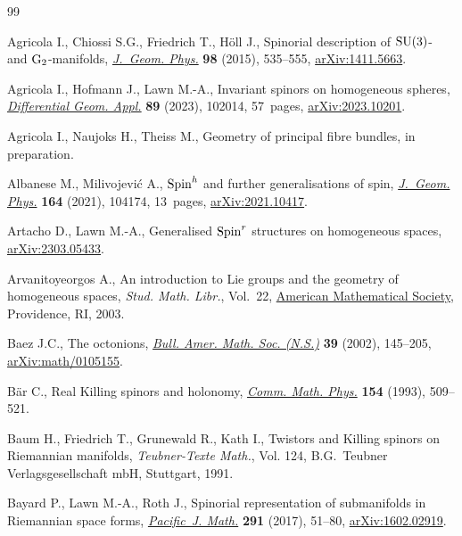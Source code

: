 \documentclass[pdftex]{sigma}
\numberwithin{equation}{section}
\begin{document}
\begin{thebibliography}{99}
\footnotesize\itemsep=0pt
		
Agricola I., Chiossi S.G., Friedrich T., H\"oll J., Spinorial description of
 {${\rm SU}(3)$}- and {${\rm G}_2$}-manifolds, \href{https://doi.org/10.1016/j.geomphys.2015.08.023}{\textit{J.~Geom. Phys.}}
 \textbf{98} (2015), 535--555, \href{https://arxiv.org/abs/1411.5663}{arXiv:1411.5663}.

Agricola I., Hofmann J., Lawn M.-A., Invariant spinors on homogeneous spheres,
 \href{https://doi.org/10.1016/j.difgeo.2023.102014}{\textit{Differential Geom. Appl.}} \textbf{89} (2023), 102014, 57~pages,
 \href{https://arxiv.org/abs/2023.10201}{arXiv:2023.10201}.

Agricola I., Naujoks H., Theiss M., Geometry of principal fibre bundles, {i}n
 preparation.

Albanese M., Milivojevi\'c A., ${\rm Spin}^h$ and further generalisations of
 spin, \href{https://doi.org/10.1016/j.geomphys.2021.104174}{\textit{J.~Geom. Phys.}} \textbf{164} (2021), 104174, 13~pages,
 \href{https://arxiv.org/abs/2021.10417}{arXiv:2021.10417}.

Artacho D., Lawn M.-A., Generalised {${\rm Spin}^r$} structures on homogeneous
 spaces, \href{https://arxiv.org/abs/2303.05433}{arXiv:2303.05433}.

Arvanitoyeorgos A., An introduction to {L}ie groups and the geometry of
 homogeneous spaces, \textit{Stud. Math. Libr.}, Vol.~22, \href{https://doi.org/10.1090/stml/022}{American
 Mathematical Society}, Providence, RI, 2003.

Baez J.C., The octonions, \href{https://doi.org/10.1090/S0273-0979-01-00934-X}{\textit{Bull. Amer. Math. Soc. (N.S.)}} \textbf{39}
 (2002), 145--205, \href{https://arxiv.org/abs/math/0105155}{arXiv:math/0105155}.

B\"ar C., Real {K}illing spinors and holonomy, \href{https://doi.org/10.1007/BF02102106}{\textit{Comm. Math. Phys.}}
 \textbf{154} (1993), 509--521.

Baum H., Friedrich T., Grunewald R., Kath I., Twistors and {K}illing spinors on
 {R}iemannian manifolds, \textit{Teubner-Texte Math.}, Vol. 124, B.G.~Teubner
 Verlagsgesellschaft mbH, Stuttgart, 1991.

Bayard P., Lawn M.-A., Roth J., Spinorial representation of submanifolds in
 {R}iemannian space forms, \href{https://doi.org/10.2140/pjm.2017.291.51}{\textit{Pacific~J. Math.}} \textbf{291} (2017),
 51--80, \href{https://arxiv.org/abs/1602.02919}{arXiv:1602.02919}.


\end{thebibliography}
\end{document}
